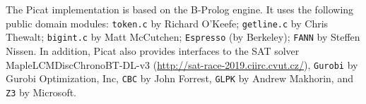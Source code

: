\documentclass[11pt]{report}
\newcommand{\ignore}[1]{}
\begin{document}
The Picat implementation is based on the B-Prolog engine. It uses the following public domain modules: \ignore{\texttt{prism} by Taisuke Sato and Yoshitaka Kameya; }\texttt{token.c} by Richard O'Keefe; \texttt{getline.c} by Chris Thewalt; \texttt{bigint.c} by Matt McCutchen; \texttt{Espresso} (by Berkeley); \texttt{FANN} by Steffen Nissen. In addition, Picat also provides interfaces to the SAT solver MapleLCMDiscChronoBT-DL-v3 (\url{http://sat-race-2019.ciirc.cvut.cz/}), \texttt{Gurobi} by Gurobi Optimization, Inc, \texttt{CBC} by John Forrest, \texttt{GLPK} by Andrew Makhorin, and \texttt{Z3} by Microsoft.

\tableofcontents

\cleardoublepage
\pagestyle{plain}
\setcounter{page}{1}












%
%


%
%








\ignore{}
%



\begin{adjustwidth}{-2cm}{-1cm}

\end{adjustwidth}
\clearpage
{}
{}
\printindex
\end{document}
